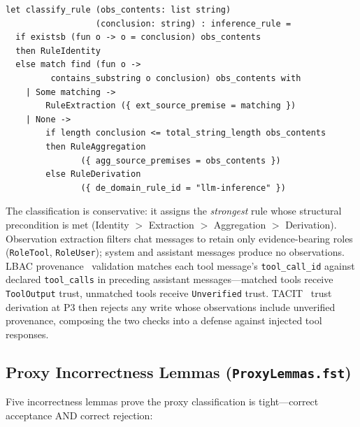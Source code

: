 \documentclass[sigplan,screen,nonacm]{acmart}
\begin{document}
\begin{lstlisting}[language=fstar,caption={Automatic inference rule classification at the model serving boundary.},label={lst:classify}]
let classify_rule (obs_contents: list string)
                  (conclusion: string) : inference_rule =
  if existsb (fun o -> o = conclusion) obs_contents
  then RuleIdentity
  else match find (fun o ->
         contains_substring o conclusion) obs_contents with
    | Some matching ->
        RuleExtraction ({ ext_source_premise = matching })
    | None ->
        if length conclusion <= total_string_length obs_contents
        then RuleAggregation
               ({ agg_source_premises = obs_contents })
        else RuleDerivation
               ({ de_domain_rule_id = "llm-inference" })
\end{lstlisting}

The classification is conservative: it assigns the \emph{strongest} rule
whose structural precondition is met (Identity $>$ Extraction $>$
Aggregation $>$ Derivation). Observation extraction filters chat messages to
retain only evidence-bearing roles (\texttt{RoleTool}, \texttt{RoleUser});
system and assistant messages produce no observations. LBAC
provenance~\cite{zhou2026lbac} validation matches each tool message's
\texttt{tool\_call\_id} against declared \texttt{tool\_calls} in preceding
assistant messages---matched tools receive \texttt{ToolOutput} trust,
unmatched tools receive \texttt{Unverified} trust. TACIT~\cite{odersky2026tacit}
trust derivation at P3 then rejects any write whose observations include
unverified provenance, composing the two checks into a defense against
injected tool responses.

\subsection{Proxy Incorrectness Lemmas (\texttt{ProxyLemmas.fst})}
\label{sec:proxy-lemmas}

Five incorrectness lemmas prove the proxy classification is tight---correct
acceptance AND correct rejection:
\end{document}
